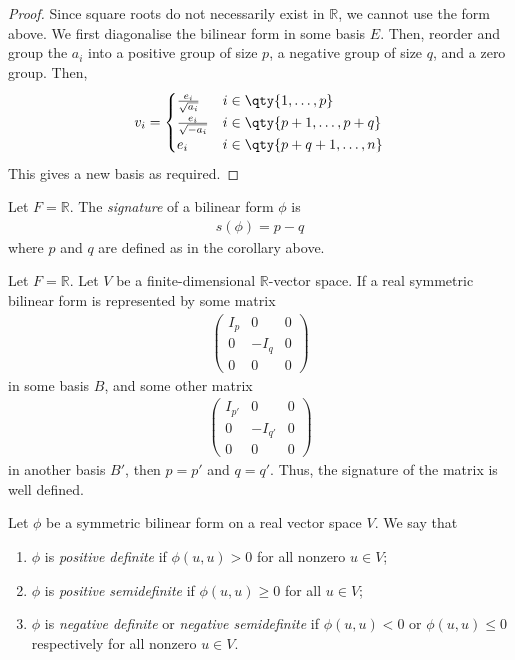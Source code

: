 \begin{proof}
	Since square roots do not necessarily exist in $\mathbb R$, we cannot use the form above.
	We first diagonalise the bilinear form in some basis $E$.
	Then, reorder and group the $a_i$ into a positive group of size $p$, a negative group of size $q$, and a zero group.
	Then,
	\begin{align*}
		v_i = \begin{cases}
			\frac{e_i}{\sqrt{a_i}}  & i \in \qty{1, \dots, p}     \\
			\frac{e_i}{\sqrt{-a_i}} & i \in \qty{p+1, \dots, p+q} \\
			e_i                     & i \in \qty{p+q+1, \dots, n}
		\end{cases}
	\end{align*}
	This gives a new basis as required.
\end{proof}
\begin{definition}
	Let $F = \mathbb R$.
	The \textit{signature} of a bilinear form $\phi$ is
	\begin{align*}
		s(\phi) = p - q
	\end{align*}
	where $p$ and $q$ are defined as in the corollary above.
\end{definition}
\begin{theorem}
	Let $F = \mathbb R$.
	Let $V$ be a finite-dimensional $\mathbb R$-vector space.
	If a real symmetric bilinear form is represented by some matrix
	\begin{align*}
		\begin{pmatrix}
			I_p & 0    & 0 \\
			0   & -I_q & 0 \\
			0   & 0    & 0
		\end{pmatrix}
	\end{align*}
	in some basis $B$, and some other matrix
	\begin{align*}
		\begin{pmatrix}
			I_{p'} & 0       & 0 \\
			0      & -I_{q'} & 0 \\
			0      & 0       & 0
		\end{pmatrix}
	\end{align*}
	in another basis $B'$, then $p = p'$ and $q = q'$.
	Thus, the signature of the matrix is well defined.
\end{theorem}
\begin{definition}
	Let $\phi$ be a symmetric bilinear form on a real vector space $V$.
	We say that
	\begin{enumerate}
		\item $\phi$ is \textit{positive definite} if $\phi(u,u) > 0$ for all nonzero $u \in V$;
		\item $\phi$ is \textit{positive semidefinite} if $\phi(u,u) \geq 0$ for all $u \in V$;
		\item $\phi$ is \textit{negative definite} or \textit{negative semidefinite} if $\phi(u,u) < 0$ or $\phi(u,u) \leq 0$ respectively for all nonzero $u \in V$.
	\end{enumerate}
\end{definition}
